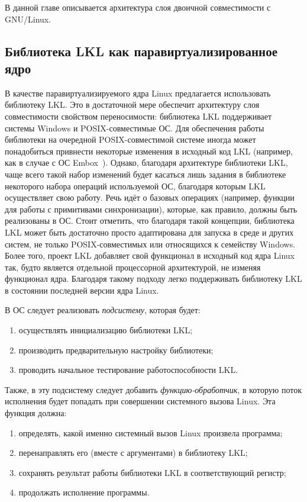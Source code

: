 
В данной главе описывается архитектура слоя двоичной совместимости с GNU/Linux.

\subsection{Библиотека LKL как паравиртуализированное ядро} \label{chapter-with-subsystem}
В качестве паравиртуализируемого ядра Linux предлагается использовать библиотеку LKL. Это в достаточной мере обеспечит архитектуру слоя совместимости свойством переносимости: библиотека LKL поддерживает системы Windows и POSIX-совместимые ОС. Для обеспечения работы библиотеки на очередной POSIX-совместимой системе иногда может понадобиться привнести некоторые изменения в исходный код LKL (например, как в случае с ОС Embox~\cite{lkl-in-embox-patch}). Однако, благодаря архитектуре библиотеки LKL, чаще всего такой набор изменений будет касаться лишь задания в библиотеке некоторого набора операций используемой ОС, благодаря которым LKL осуществляет свою работу. Речь идёт о базовых операциях (например, функции для работы с примитивами синхронизации), которые, как правило, должны быть реализованы в ОС. Стоит отметить, что благодаря такой концепции, библиотека LKL может быть достаточно просто адаптирована для запуска в среде и других систем, не только POSIX-совместимых или относящихся к семейству Windows. Более того, проект LKL добавляет свой функционал в исходный код ядра Linux так, будто является отдельной процессорной архитектурой, не изменяя функционал ядра. Благодаря такому подходу легко поддерживать библиотеку LKL в состоянии последней версии ядра Linux.

В ОС следует реализовать \textit{подсистему}, которая будет:
\begin{enumerate}
    \item осуществлять инициализацию библиотеки LKL;
    \item производить предварительную настройку библиотеки;
    \item проводить начальное тестирование работоспособности LKL.
\end{enumerate}

Также, в эту подсистему следует добавить \textit{функцию-обработчик}, в которую поток исполнения будет попадать при совершении системного вызова Linux. Эта функция должна:
\begin{enumerate}
    \item определять, какой именно системный вызов Linux произвела программа;
    \item перенаправлять его (вместе с аргументами) в библиотеку LKL;
    \item сохранять результат работы библиотеки LKL в соответствующий регистр;
    \item продолжать исполнение программы.
\end{enumerate}

